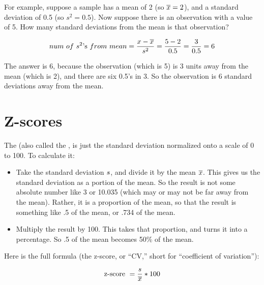 \documentclass[../../../main.tex]{subfiles}
\begin{document}
\noindent
For example, suppose a sample has a mean of 2 (so $\overline{x} = 2$), and a standard deviation of 0.5 (so $s^{2} = 0.5$). Now suppose there is an observation with a value of 5. How many standard deviations from the mean is that observation? 

\begin{equation*}
  num~of~s^{2}\text{'s}~from~mean = \frac{x - \overline{x}}{s^{2}} = \frac{5 - 2}{0.5} = \frac{3}{0.5} = 6
\end{equation*}

\noindent
The answer is 6, because the observation (which is 5) is 3 units away from the mean (which is 2), and there are six 0.5's in 3. So the observation is 6 standard deviations away from the mean.



\section{Z-scores}

The  (also called the , is just the standard deviation normalized onto a scale of 0 to 100. To calculate it: 

\begin{itemize}

  \item Take the standard deviation $s{}$, and divide it by the mean $\overline{x}$. This gives us the standard deviation as a portion of the mean. So the result is not some absolute number like 3 or 10.035 (which may or may not be far away from the mean). Rather, it is a proportion of the mean, so that the result is something like .5 of the mean, or .734 of the mean.
  
  \item Multiply the result by 100. This takes that proportion, and turns it into a percentage. So .5 of the mean becomes 50\% of the mean.
  
\end{itemize}

\noindent
Here is the full formula (the z-score, or ``CV,'' short for ``coefficient of variation''):

\begin{equation*}
  \text{z-score } = \frac{s{}}{\overline{x}} * 100
\end{equation*}
\end{document}
